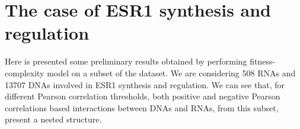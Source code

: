 \documentclass[10pt,a4paper]{article}
\begin{document}
\section{The case of ESR1 synthesis and regulation}
Here is presented some preliminary results obtained by performing fitness-complexity model on a subset of the dataset. We are considering 508 RNAs and 13707 DNAs involved in ESR1 synthesis and regulation. We can see that, for different Pearson correlation thresholds, both positive and negative Pearson correlations based interactions between DNAs and RNAs, from this subset, present a nested structure.
\begin{figure}[h!]
\end{figure}
\end{document}
